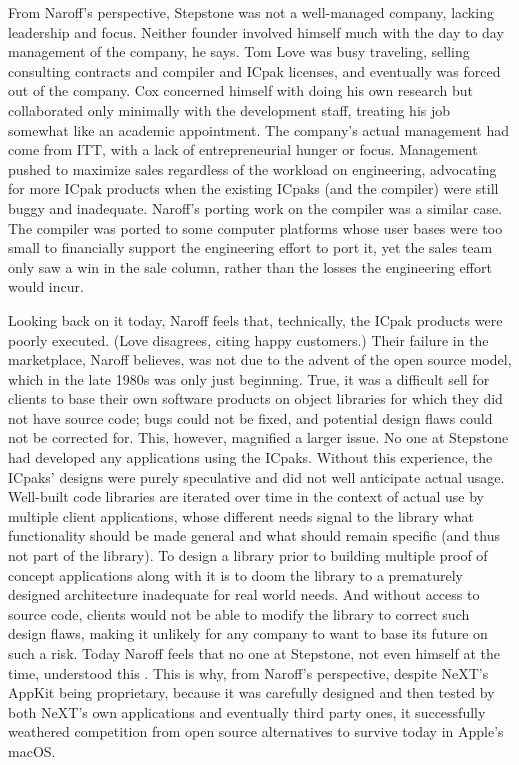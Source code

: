 \documentclass[acmsmall,screen]{acmart}
\begin{document}
From Naroff's perspective, Stepstone was not a well-managed company, lacking leadership and focus. Neither founder involved himself much with the day to day management of the company, he says. Tom Love was busy traveling, selling consulting contracts and compiler and ICpak licenses, and eventually was forced out of the company. Cox concerned himself with doing his own research but collaborated only minimally with the development staff, treating his job somewhat like an academic appointment. The company's actual management had come from ITT, with a lack of entrepreneurial hunger or focus. Management pushed to maximize sales regardless of the workload on engineering, advocating for more ICpak products when the existing ICpaks (and the compiler) were still buggy and inadequate. Naroff's porting work on the compiler was a similar case. The compiler was ported to some computer platforms whose user bases were too small to financially support the engineering effort to port it, yet the sales team only saw a win in the sale column, rather than the losses the engineering effort would incur. 

Looking back on it today, Naroff feels that, technically, the ICpak products were poorly executed. (Love disagrees, citing happy customers.) Their failure in the marketplace, Naroff believes, was not due to the advent of the open source model, which in the late 1980s was only just beginning. True, it was a difficult sell for clients to base their own software products on object libraries for which they did not have source code; bugs could not be fixed, and potential design flaws could not be corrected for. This, however, magnified a larger issue. No one at Stepstone had developed any applications using the ICpaks. Without this experience, the ICpaks' designs were purely speculative and did not well anticipate actual usage. Well-built code libraries are iterated over time in the context of actual use by multiple client applications, whose different needs signal to the library what functionality should be made general and what should remain specific (and thus not part of the library). To design a library prior to building multiple proof of concept applications along with it is to doom the library to a prematurely designed architecture inadequate for real world needs. And without access to source code, clients would not be able to modify the library to correct such design flaws, making it unlikely for any company to want to base its future on such a risk. Today Naroff feels that no one at Stepstone, not even himself at the time, understood this \citep[24--25]{naroff_oral_2018}. This is why, from Naroff's perspective, despite NeXT's AppKit being proprietary, because it was carefully designed and then tested by both NeXT's own applications and eventually third party ones, it successfully weathered competition from open source alternatives to survive today in Apple's macOS. 
\end{document}
